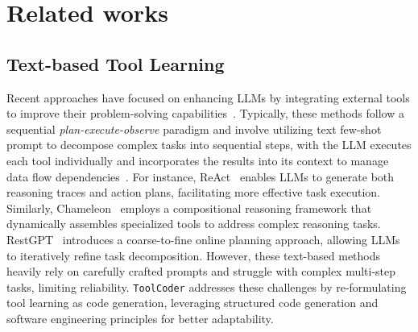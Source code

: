 \section{Related works}
\subsection{Text-based Tool Learning}
Recent approaches have focused on enhancing LLMs by integrating external tools to improve their problem-solving capabilities~\cite{DBLP:journals/corr/abs-2404-11584,DBLP:journals/corr/abs-2405-17935,qian-etal-2023-creator,DBLP:conf/iclr/YuanC000J24}. Typically, these methods follow a sequential \textit{plan-execute-observe} paradigm and involve utilizing text few-shot prompt to decompose complex tasks into sequential steps, with the LLM executes each tool individually and incorporates the results into its context to manage data flow dependencies~\cite{DBLP:journals/corr/abs-2402-18157,DBLP:conf/nips/ShinnCGNY23,shi-etal-2024-learning,DBLP:journals/corr/abs-2303-09014}. For instance, ReAct~\cite{DBLP:conf/iclr/YaoZYDSN023} enables LLMs to generate both reasoning traces and action plans, facilitating more effective task execution. Similarly, Chameleon~\cite{DBLP:conf/nips/LuPCGCWZG23} employs a compositional reasoning framework that dynamically assembles specialized tools to address complex reasoning tasks. RestGPT~\cite{DBLP:journals/corr/abs-2306-06624} introduces a coarse-to-fine online planning approach, allowing LLMs to iteratively refine task decomposition. However, these text-based methods heavily rely on carefully crafted prompts and struggle with complex multi-step tasks, limiting reliability. \texttt{ToolCoder} addresses these challenges by re-formulating tool learning as code generation, leveraging structured code generation and software engineering principles for better adaptability.



